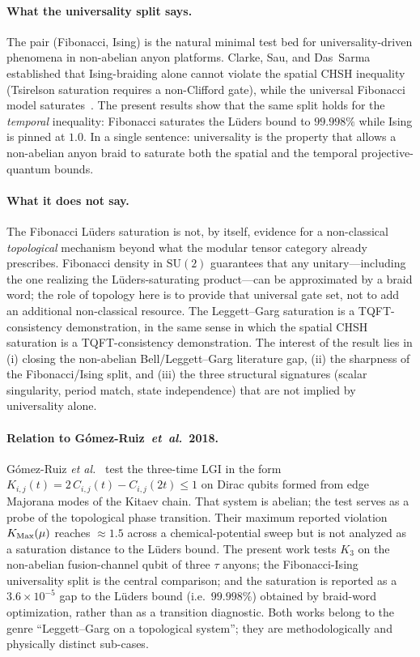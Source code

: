 \documentclass[aps,prx,reprint,amsmath,amssymb,floatfix,nofootinbib,superscriptaddress]{revtex4-2}
\begin{document}
\paragraph{What the universality split says.}
The pair (Fibonacci, Ising) is the natural minimal test bed for
universality-driven phenomena in non-abelian anyon platforms.
Clarke, Sau, and Das~Sarma~\cite{ClarkeSauDasSarma2016} established that
Ising-braiding alone cannot violate the spatial CHSH inequality
(Tsirelson saturation requires a non-Clifford gate), while the
universal Fibonacci model
saturates~\cite{Brennen2009,NayakSimonStern2008}. The present results
show that the same split holds for the \emph{temporal} inequality:
Fibonacci saturates the L\"uders bound to $99.998\%$ while Ising is
pinned at $1.0$. In a single sentence: universality is the property
that allows a non-abelian anyon braid to saturate both the spatial
and the temporal projective-quantum bounds.

\paragraph{What it does not say.}
The Fibonacci L\"uders saturation is not, by itself, evidence for a
non-classical \emph{topological} mechanism beyond what the modular
tensor category already prescribes. Fibonacci density in
$\mathrm{SU}(2)$ guarantees that any unitary---including the one
realizing the L\"uders-saturating product---can be approximated by a
braid word; the role of topology here is to provide that universal
gate set, not to add an additional non-classical resource. The
Leggett--Garg saturation is a TQFT-consistency demonstration, in the
same sense in which the spatial CHSH saturation is a TQFT-consistency
demonstration. The interest of the result lies in (i) closing the
non-abelian Bell/Leggett--Garg literature gap, (ii) the sharpness of
the Fibonacci/Ising split, and (iii) the three structural signatures
(scalar singularity, period match, state independence) that are not
implied by universality alone.

\paragraph{Relation to G\'omez-Ruiz~\textit{et~al.}~2018.}
G\'omez-Ruiz \emph{et al.}~\cite{GomezRuiz2018} test the three-time
LGI in the form $K_{i,j}(t) = 2\,C_{i,j}(t) - C_{i,j}(2t) \leq 1$ on
Dirac qubits formed from edge Majorana modes of the Kitaev chain.
That system is abelian; the test serves as a probe of the topological
phase transition. Their maximum reported violation $K_{\rm Max}(\mu)$
reaches $\approx 1.5$ across a chemical-potential sweep but is not
analyzed as a saturation distance to the L\"uders bound. The present
work tests $K_{3}$ on the non-abelian fusion-channel qubit of three
$\tau$ anyons; the Fibonacci-Ising universality split is the central
comparison; and the saturation is reported as a $3.6 \times 10^{-5}$
gap to the L\"uders bound (i.e.\ $99.998\%$) obtained by braid-word
optimization, rather than as a transition diagnostic. Both works
belong to the genre ``Leggett--Garg on a topological system''; they
are methodologically and physically distinct sub-cases.
\end{document}
